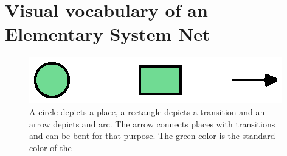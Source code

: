 \section{Visual vocabulary of an Elementary System Net}
\label{app:elsysnet}

\begin{figure}
    \includegraphics[scale=1]{graphics/visual_vocabulary_elementary_system_net}
    \caption{A circle depicts a place, a rectangle depicts a transition and an arrow depicts and arc. The arrow connects places with transitions and can be bent for that purpose. The green color is the standard color of the }
    \label{fig:visual_vocabulary_elementary_system_net}
\end{figure}
